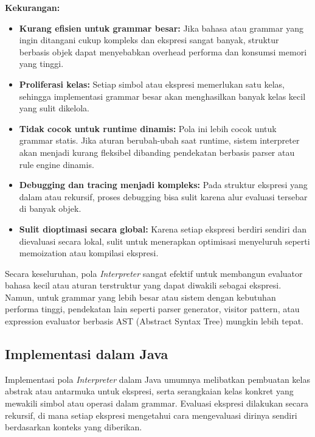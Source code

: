 \textbf{Kekurangan:}
\begin{itemize}
	\item \textbf{Kurang efisien untuk grammar besar:} Jika bahasa atau grammar yang ingin ditangani cukup kompleks dan ekspresi sangat banyak, struktur berbasis objek dapat menyebabkan overhead performa dan konsumsi memori yang tinggi.
	
	\item \textbf{Proliferasi kelas:} Setiap simbol atau ekspresi memerlukan satu kelas, sehingga implementasi grammar besar akan menghasilkan banyak kelas kecil yang sulit dikelola.
	
	\item \textbf{Tidak cocok untuk runtime dinamis:} Pola ini lebih cocok untuk grammar statis. Jika aturan berubah-ubah saat runtime, sistem interpreter akan menjadi kurang fleksibel dibanding pendekatan berbasis parser atau rule engine dinamis.
	
	\item \textbf{Debugging dan tracing menjadi kompleks:} Pada struktur ekspresi yang dalam atau rekursif, proses debugging bisa sulit karena alur evaluasi tersebar di banyak objek.
	
	\item \textbf{Sulit dioptimasi secara global:} Karena setiap ekspresi berdiri sendiri dan dievaluasi secara lokal, sulit untuk menerapkan optimisasi menyeluruh seperti memoization atau kompilasi ekspresi.
\end{itemize}

Secara keseluruhan, pola \textit{Interpreter} sangat efektif untuk membangun evaluator bahasa kecil atau aturan terstruktur yang dapat diwakili sebagai ekspresi. Namun, untuk grammar yang lebih besar atau sistem dengan kebutuhan performa tinggi, pendekatan lain seperti parser generator, visitor pattern, atau expression evaluator berbasis AST (Abstract Syntax Tree) mungkin lebih tepat.


\subsection{Implementasi dalam Java}

Implementasi pola \textit{Interpreter} dalam Java umumnya melibatkan pembuatan kelas abstrak atau antarmuka untuk ekspresi, serta serangkaian kelas konkret yang mewakili simbol atau operasi dalam grammar. Evaluasi ekspresi dilakukan secara rekursif, di mana setiap ekspresi mengetahui cara mengevaluasi dirinya sendiri berdasarkan konteks yang diberikan.

